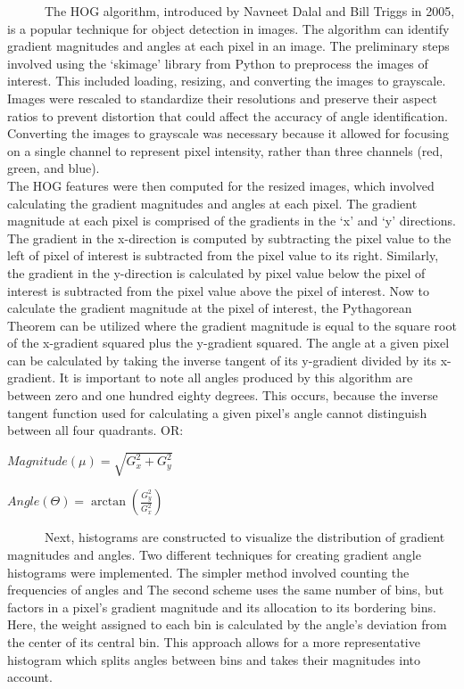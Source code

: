 \documentclass[
  letterpaper,
  DIV=11,
  numbers=noendperiod]{scrreprt}
\begin{document}
~~~~~~The HOG algorithm, introduced by Navneet Dalal and Bill Triggs in
2005, is a popular technique for object detection in images. The
algorithm can identify gradient magnitudes and angles at each pixel in
an image. The preliminary steps involved using the `skimage' library
from Python to preprocess the images of interest. This included loading,
resizing, and converting the images to grayscale. Images were rescaled
to standardize their resolutions and preserve their aspect ratios to
prevent distortion that could affect the accuracy of angle
identification. Converting the images to grayscale was necessary because
it allowed for focusing on a single channel to represent pixel
intensity, rather than three channels (red, green, and blue).\\
\hspace*{0.333em}\hspace*{0.333em}\hspace*{0.333em}\hspace*{0.333em}\hspace*{0.333em}\hspace*{0.333em}The
HOG features were then computed for the resized images, which involved
calculating the gradient magnitudes and angles at each pixel. The
gradient magnitude at each pixel is comprised of the gradients in the
`x' and `y' directions. The gradient in the x-direction is computed by
subtracting the pixel value to the left of pixel of interest is
subtracted from the pixel value to its right. Similarly, the gradient in
the y-direction is calculated by pixel value below the pixel of interest
is subtracted from the pixel value above the pixel of interest. Now to
calculate the gradient magnitude at the pixel of interest, the
Pythagorean Theorem can be utilized where the gradient magnitude is
equal to the square root of the x-gradient squared plus the y-gradient
squared. The angle at a given pixel can be calculated by taking the
inverse tangent of its y-gradient divided by its x-gradient. It is
important to note all angles produced by this algorithm are between zero
and one hundred eighty degrees. This occurs, because the inverse tangent
function used for calculating a given pixel's angle cannot distinguish
between all four quadrants. OR:

\(Magnitude(\mu)=\sqrt{G_{x}^{2} + G_{y}^{2}}\)

\(Angle(\Theta)=\arctan({\frac{G_{y}^{2}}{G_{x}^{2}}})\)

~~~~~~Next, histograms are constructed to visualize the distribution of
gradient magnitudes and angles. Two different techniques for creating
gradient angle histograms were implemented. The simpler method involved
counting the frequencies of angles and The second scheme uses the same
number of bins, but factors in a pixel's gradient magnitude and its
allocation to its bordering bins. Here, the weight assigned to each bin
is calculated by the angle's deviation from the center of its central
bin. This approach allows for a more representative histogram which
splits angles between bins and takes their magnitudes into account.
\end{document}
